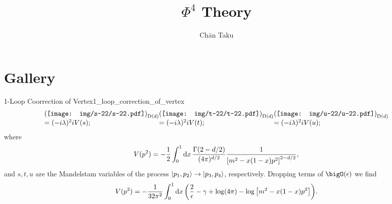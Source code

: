 \documentclass{article}
\title{\texorpdfstring{$\Phi^4$ Theory}{Phi4 Theory}}
\author{Ch\=an Taku}
\begin{document}
\maketitle

\section{Gallery}

\begin{proposition}{1-Loop Coorrection of Vertex}{1_loop_correction_of_vertex}
    \[ 
        \arraycolsep=0pt
        \begin{array}{lll}
            \qty(\texttt{[image: img/s-22/s-22.pdf]})_{\operatorname{D}(d)} & \qty(\texttt{[image: img/t-22/t-22.pdf]})_{\operatorname{D}(d)} & \qty(\texttt{[image: img/u-22/u-22.pdf]})_{\operatorname{D}(d)} \\
            = (-i\lambda)^2 iV(s); & = (-i\lambda)^2 iV(t); & = (-i\lambda)^2 iV(u);
        \end{array}
    \]
    where
    \[ V(p^2) = -\frac{1}{2} \int_0^1 \dd{x} \frac{\Gamma(2-d/2)}{(4\pi)^{d/2}} \frac{1}{\qty[m^2 - x(1-x)p^2]^{2-d/2}}, \]
    and $s,t,u$ are the Mandelstam variables of the process $\ket{p_1,p_2}\rightarrow \ket{p_3,p_4}$, respectively.
    Dropping terms of $\bigO(\epsilon)$ we find
    \[ V(p^2) = -\frac{1}{32\pi^2} \int_0^1 \dd{x} \qty(\frac{2}{\epsilon} - \gamma + \log(4\pi) - \log\qty[m^2 - x(1-x)p^2]). \]
\end{proposition}

% 
% 
\end{document}
